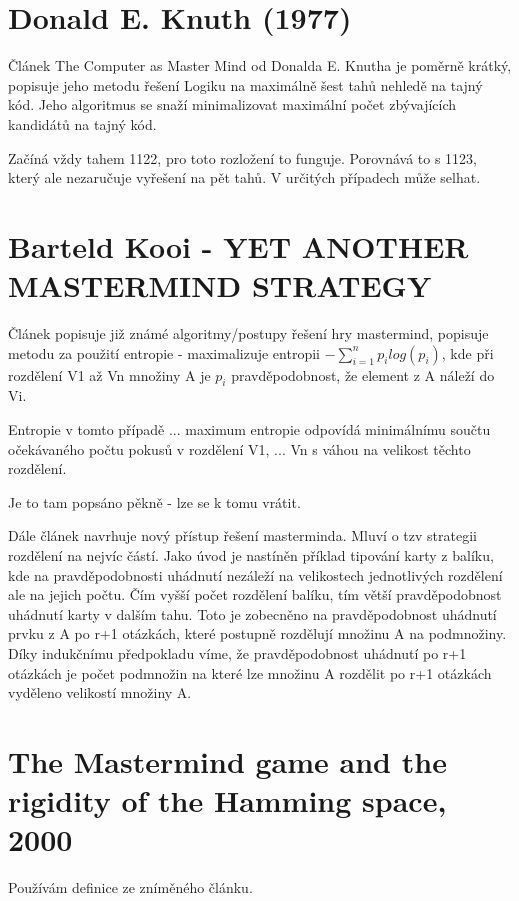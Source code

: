 \section{Donald E. Knuth (1977) \cite{donald_e__knuth_1977}}

Článek The Computer as Master Mind od Donalda E. Knutha je poměrně krátký, popisuje jeho metodu řešení Logiku na maximálně šest tahů nehledě na tajný kód. Jeho algoritmus se snaží minimalizovat maximální počet zbývajících kandidátů na tajný kód. 

Začíná vždy tahem 1122, pro toto rozložení to funguje. Porovnává to s 1123, který ale nezaručuje vyřešení na pět tahů. V určitých případech může selhat. 

\section{Barteld Kooi - YET ANOTHER MASTERMIND STRATEGY }

Článek popisuje již známé algoritmy/postupy řešení hry mastermind,
popisuje metodu za použití entropie - maximalizuje entropii $-\sum_{i=1}^n p_i log(p_i)$, kde při rozdělení V1 až Vn množiny A je $p_i$ pravděpodobnost, že element z A náleží do Vi. 

Entropie v tomto případě ... maximum entropie odpovídá minimálnímu součtu očekávaného počtu pokusů v rozdělení V1, ... Vn s váhou na velikost těchto rozdělení. 

Je to tam popsáno pěkně - lze se k tomu vrátit.

Dále článek navrhuje nový přístup řešení masterminda. Mluví o tzv strategii rozdělení na nejvíc částí. Jako úvod je nastíněn příklad tipování karty z balíku, kde na pravděpodobnosti uhádnutí nezáleží na velikostech jednotlivých rozdělení ale na jejich počtu. Čím vyšší počet rozdělení balíku, tím větší pravděpodobnost uhádnutí karty v dalším tahu. Toto je zobecněno na pravděpodobnost uhádnutí prvku z A po r+1 otázkách, které postupně rozdělují množinu A na podmnožiny. Díky indukčnímu předpokladu víme, že pravděpodobnost uhádnutí po r+1 otázkách je počet podmnožin na které lze množinu A rozdělit po r+1 otázkách vyděleno velikostí množiny A. 


\section{The Mastermind game and the rigidity of the Hamming space, 2000 \cite{866673}}
Používám definice ze zníměného článku.


